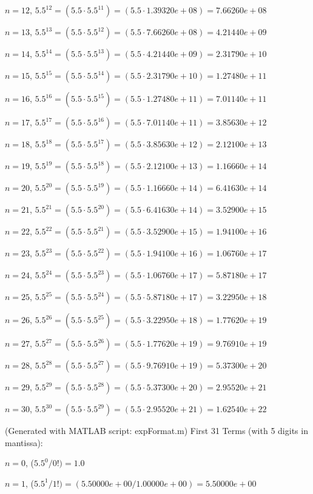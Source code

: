 \documentclass[12pt]{article}
\begin{document}
$n = 12$, $5.5^{12} = (5.5 \cdot 5.5^{11}) = (5.5 \cdot 1.39320e+08) = 7.66260e+08$

$n = 13$, $5.5^{13} = (5.5 \cdot 5.5^{12}) = (5.5 \cdot 7.66260e+08) = 4.21440e+09$

$n = 14$, $5.5^{14} = (5.5 \cdot 5.5^{13}) = (5.5 \cdot 4.21440e+09) = 2.31790e+10$

$n = 15$, $5.5^{15} = (5.5 \cdot 5.5^{14}) = (5.5 \cdot 2.31790e+10) = 1.27480e+11$

$n = 16$, $5.5^{16} = (5.5 \cdot 5.5^{15}) = (5.5 \cdot 1.27480e+11) = 7.01140e+11$

$n = 17$, $5.5^{17} = (5.5 \cdot 5.5^{16}) = (5.5 \cdot 7.01140e+11) = 3.85630e+12$

$n = 18$, $5.5^{18} = (5.5 \cdot 5.5^{17}) = (5.5 \cdot 3.85630e+12) = 2.12100e+13$

$n = 19$, $5.5^{19} = (5.5 \cdot 5.5^{18}) = (5.5 \cdot 2.12100e+13) = 1.16660e+14$

$n = 20$, $5.5^{20} = (5.5 \cdot 5.5^{19}) = (5.5 \cdot 1.16660e+14) = 6.41630e+14$

$n = 21$, $5.5^{21} = (5.5 \cdot 5.5^{20}) = (5.5 \cdot 6.41630e+14) = 3.52900e+15$

$n = 22$, $5.5^{22} = (5.5 \cdot 5.5^{21}) = (5.5 \cdot 3.52900e+15) = 1.94100e+16$

$n = 23$, $5.5^{23} = (5.5 \cdot 5.5^{22}) = (5.5 \cdot 1.94100e+16) = 1.06760e+17$

$n = 24$, $5.5^{24} = (5.5 \cdot 5.5^{23}) = (5.5 \cdot 1.06760e+17) = 5.87180e+17$

$n = 25$, $5.5^{25} = (5.5 \cdot 5.5^{24}) = (5.5 \cdot 5.87180e+17) = 3.22950e+18$

$n = 26$, $5.5^{26} = (5.5 \cdot 5.5^{25}) = (5.5 \cdot 3.22950e+18) = 1.77620e+19$

$n = 27$, $5.5^{27} = (5.5 \cdot 5.5^{26}) = (5.5 \cdot 1.77620e+19) = 9.76910e+19$

$n = 28$, $5.5^{28} = (5.5 \cdot 5.5^{27}) = (5.5 \cdot 9.76910e+19) = 5.37300e+20$

$n = 29$, $5.5^{29} = (5.5 \cdot 5.5^{28}) = (5.5 \cdot 5.37300e+20) = 2.95520e+21$

$n = 30$, $5.5^{30} = (5.5 \cdot 5.5^{29}) = (5.5 \cdot 2.95520e+21) = 1.62540e+22$

(Generated with MATLAB script: expFormat.m)
\newpage
First 31 Terms (with 5 digits in mantissa):

$n = 0$, ($5.5^{0} / 0!) = 1.0$

$n = 1$, ($5.5^{1} / 1!) = (5.50000e+00 / 1.00000e+00) = 5.50000e+00$
\end{document}
